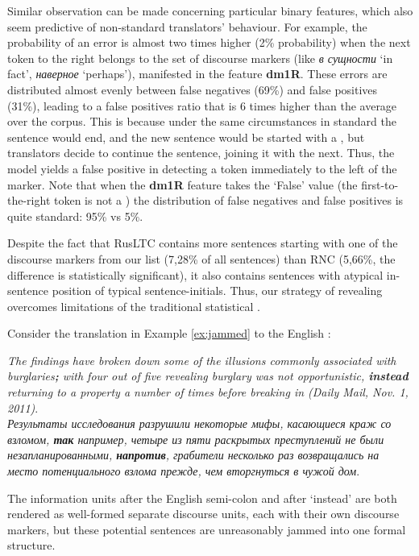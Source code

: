 \documentclass[output=paper]{langsci/langscibook.cls}
\begin{document}
Similar observation can be made concerning particular binary features, which also seem predictive of non-standard translators' behaviour. For example, the probability of an error is almost two times higher (2\% probability) when the next token to the right belongs to the set of discourse markers (like \textit{в сущности} `in fact', \textit{наверное} `perhaps'), manifested in the feature \textbf{dm1R}. These errors are distributed almost evenly between false negatives (69\%) and false positives (31\%), leading to a false positives ratio that is 6 times higher than the average over the corpus. This is because under the same circumstances in standard  the sentence would end, and the new sentence would be started with a , but translators decide to continue the sentence, joining it with the next. Thus, the model yields a false positive in detecting a  token immediately to the left of the marker. Note that when the \textbf{dm1R} feature takes the `False' value (the first-to-the-right token is not a ) the distribution of false negatives and false positives is quite standard: 95\% vs 5\%. 


Despite the fact that RusLTC contains more sentences starting with one of the discourse markers from our list (7,28\% of all sentences) than RNC (5,66\%, the difference is statistically significant), it also contains sentences with atypical in-sentence position of typical sentence-initials. Thus, our strategy of revealing  overcomes limitations of the traditional statistical . 

Consider the translation in Example \ref{ex:jammed} to the English : 

\ea
\label{ex:jammed}

\textit{The findings have broken down some of the illusions commonly associated with burglaries\textbf{;} with four out of five revealing burglary was not opportunistic, \textbf{instead} returning to a property a number of times before breaking in (Daily Mail, Nov. 1, 2011)}.\\
\glt
\textit{Результаты исследования разрушили неко\-торые мифы, касающиеся краж со взломом, \textbf{так} например, четыре из пяти раскрытых преступлений не были незапланированными, \textbf{напротив}, граби\-те\-ли несколько раз возвращались на место потенциального взлома прежде, чем вторгнуться в чужой дом}.
\z

The information units after the English semi-colon and after `instead' are both rendered as well-formed separate discourse units, each with their own discourse markers, but these potential sentences are unreasonably jammed into one formal structure.   
\end{document}
